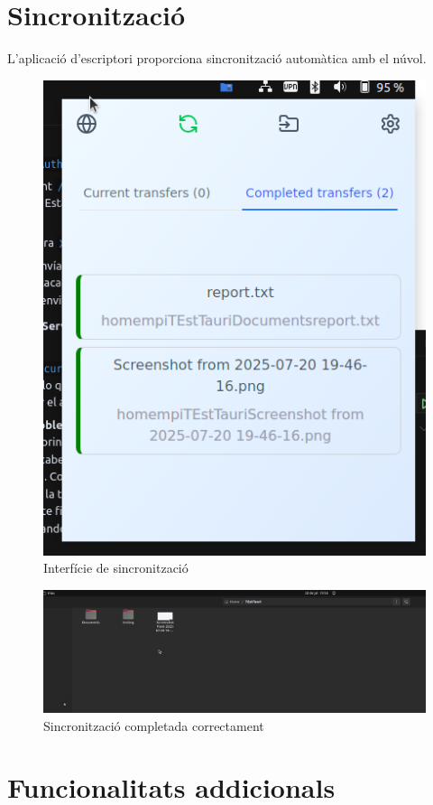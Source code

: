 \section{Sincronització}

L'aplicació d'escriptori proporciona sincronització automàtica amb el núvol.

\begin{figure}[H]
\centering
\includegraphics[width=0.8\linewidth]{Figures/implementacio/desktopSync.png}
\caption{Interfície de sincronització}
\label{fig:desktopSync}
\end{figure}

\begin{figure}[H]
\centering
\includegraphics[width=0.8\linewidth]{Figures/implementacio/DesktopSyncSuccess.png}
\caption{Sincronització completada correctament}
\label{fig:DesktopSyncSuccess}
\end{figure}

\section{Funcionalitats addicionals}

